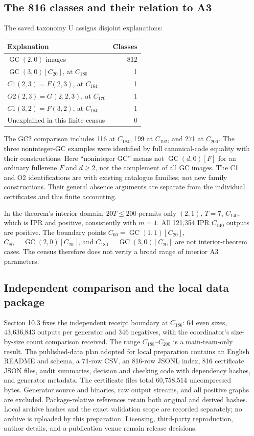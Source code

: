 \documentclass[11pt]{amsart}
\newcommand{\GC}{\operatorname{GC}}
\begin{document}
\subsection{The 816 classes and their relation to A3}
The saved taxonomy U assigns disjoint explanations:
\begin{center}\small
\begin{tabular}{lr}\toprule
Explanation & Classes\\\midrule
$\GC(2,0)$ images &812\\
$\GC(3,0)[C_{20}]$, at $C_{180}$ &1\\
$C1(2,3)=F(2,3)$, at $C_{164}$ &1\\
$O2(2,3)=G(2,2,3)$, at $C_{170}$ &1\\
$C1(3,2)=F(3,2)$, at $C_{184}$ &1\\
Unexplained in this finite census &0\\\bottomrule
\end{tabular}\end{center}
The GC2 comparison includes 116 at $C_{184}$, 199 at $C_{192}$, and
271 at $C_{200}$. The three noninteger-GC examples were identified by
full canonical-code equality with their constructions. Here
``noninteger GC'' means not $\GC(d,0)[F]$ for an ordinary fullerene
$F$ and $d\ge2$, not the complement of all GC images. The C1 and O2
identifications are with existing catalogue families, not new family
constructions. Their general absence arguments are separate from the
individual certificates and this finite accounting.

In the theorem's interior domain, $20T\le200$ permits only $(2,1)$,
$T=7$, $C_{140}$, which is IPR and positive, consistently with $m=1$.
All 121,354 IPR $C_{140}$ outputs are positive. The boundary points
$C_{60}=\GC(1,1)[C_{20}]$, $C_{80}=\GC(2,0)[C_{20}]$, and
$C_{180}=\GC(3,0)[C_{20}]$ are not interior-theorem cases. The census
therefore does not verify a broad range of interior A3 parameters.

\subsection{Independent comparison and the local data package}
Section 10.3 fixes the independent receipt boundary at $C_{186}$:
64 even sizes, 43,636,843 outputs per generator and 346 negatives,
with the coordinator's size-by-size count comparison received.
The range $C_{188}$--$C_{200}$ is a main-team-only result. The published-data plan adopted for local preparation
contains an English README and schema, a 71-row CSV, an 816-row JSONL
index, 816 certificate JSON files, audit summaries, decision and
checking code with dependency hashes, and generator metadata.
The certificate files total 60,758,514 uncompressed bytes. Generator
source and binaries, raw output streams, and all positive graphs are
excluded. Package-relative references retain both original and derived
hashes. Local archive hashes and the exact validation scope are recorded
separately; no archive is uploaded by this preparation. Licensing,
third-party reproduction, author details, and a publication venue remain
release decisions.
\end{document}
